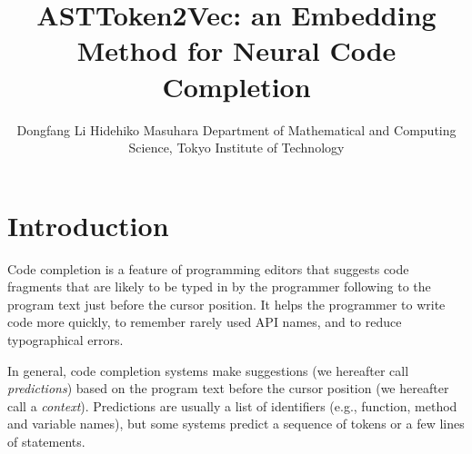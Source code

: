 \documentclass[E]{compsoft}
\begin{document}
\title{ASTToken2Vec: an Embedding Method for Neural Code Completion}

\author{Dongfang Li  \quad   Hidehiko Masuhara
%
%
%
%
%
{Department of Mathematical and Computing Science, Tokyo Institute of Technology}}




\maketitle \thispagestyle {empty}







\section{Introduction}
Code completion is a feature of programming editors that suggests code fragments that are likely to be typed in by the programmer following to the program text just before the cursor position.  It helps the programmer to write code more quickly, to remember rarely used API names, and to reduce typographical errors.

In general, code completion systems make suggestions (we hereafter call \emph{predictions}) based on the program text before the cursor position (we hereafter call a \emph{context}).  Predictions are usually a list of identifiers (e.g., function, method and variable names), but some systems predict a sequence of tokens or a few lines of statements.
\end{document}
